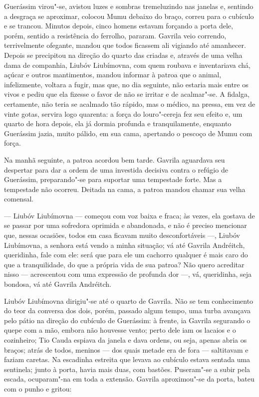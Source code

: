 Guerássim virou"-se, avistou luzes e sombras tremeluzindo nas janelas e,
sentindo a desgraça se aproximar, colocou Mumu debaixo do braço, correu
para o cubículo e se trancou. Minutos depois, cinco homens estavam
forçando a porta dele, porém, sentido a resistência do ferrolho,
pararam. Gavrila veio correndo, terrivelmente ofegante, mandou que todos
ficassem ali vigiando até amanhecer. Depois se precipitou na direção do
quarto das criadas e, através de uma velha dama de companhia, Liubóv
Liubímovna, com quem roubava e inventariava chá, açúcar e outros
mantimentos, mandou informar à patroa que o animal, infelizmente,
voltara a fugir, mas que, no dia seguinte, não estaria mais entre os
vivos e pediu que ela fizesse o favor de não se irritar e de acalmar"-se.
A fidalga, certamente, não teria se acalmado tão rápido, mas o
médico, na pressa, em vez de vinte gotas, servira logo quarenta: a força
do louro"-cereja fez seu efeito e, um quarto de hora depois, ela já
dormia profunda e tranquilamente, enquanto Guerássim jazia, muito
pálido, em sua cama, apertando o pescoço de Mumu com força.

Na manhã seguinte, a patroa acordou bem tarde. Gavrila aguardava seu
despertar para dar a ordem de uma investida decisiva contra o refúgio de
Guerássim, preparando"-se para suportar uma tempestade forte. Mas a
tempestade não ocorreu. Deitada na cama, a patroa mandou chamar sua
velha comensal.

--- Liubóv Liubímovna --- começou com voz baixa e fraca; às vezes, ela
gostava de se passar por uma sofredora oprimida e abandonada, e não é
preciso mencionar que, nessas ocasiões, todos em casa ficavam muito
desconfortáveis ---, Liubóv Liubímovna, a senhora está vendo a minha
situação; vá até Gavrila Andréitch, queridinha, fale com ele: será que
para ele um cachorro qualquer é mais caro do que a tranquilidade, do que
a própria vida de sua patroa? Não quero acreditar nisso --- acrescentou
com uma expressão de profunda dor ---, vá, queridinha, seja bondosa, vá
até Gavrila Andréitch.

Liubóv Liubímovna dirigiu"-se até o quarto de Gavrila. Não se tem
conhecimento do teor da conversa dos dois, porém, passado algum tempo,
uma turba avançava pelo pátio na direção do cubículo de Guerássim: à
frente, ia Gavrila segurando o quepe com a mão, embora não houvesse
vento; perto dele iam os lacaios e o cozinheiro; Tio Cauda espiava da
janela e dava ordens, ou seja, apenas abria os braços; atrás de todos, meninos --- dos quais metade era de fora --- 
saltitavam e faziam caretas. Na escadinha estreita que levava ao cubículo estava sentada uma
sentinela; junto à porta, havia mais duas, com bastões. Puseram"-se a
subir pela escada, ocuparam"-na em toda a extensão. Gavrila aproximou"-se
da porta, bateu com o punho e gritou:

